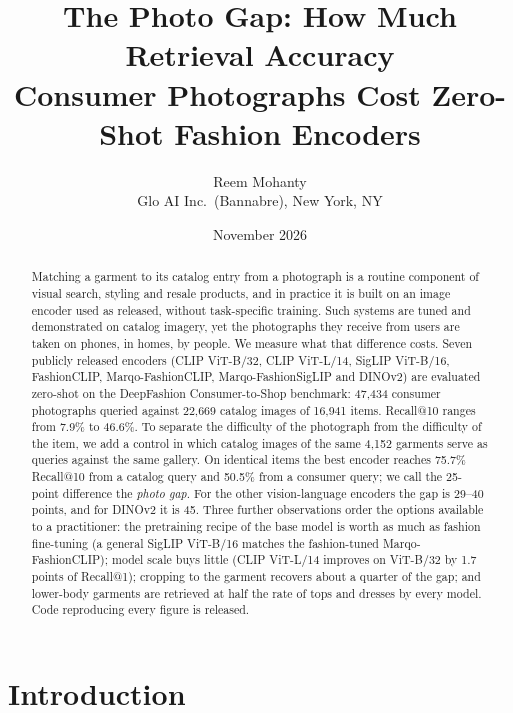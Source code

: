 \documentclass[10pt,twocolumn,letterpaper]{article}
\title{\LARGE\bfseries The Photo Gap: How Much Retrieval Accuracy\\Consumer Photographs Cost Zero-Shot Fashion Encoders}
\author{%
  Reem Mohanty\\
  Glo AI Inc.\ (Bannabre), New York, NY
}
\date{November 2026}
\begin{document}
\maketitle

\begin{abstract}
Matching a garment to its catalog entry from a photograph is a routine component of visual search, styling and resale products, and in practice it is built on an image encoder used as released, without task-specific training. Such systems are tuned and demonstrated on catalog imagery, yet the photographs they receive from users are taken on phones, in homes, by people. We measure what that difference costs. Seven publicly released encoders (CLIP ViT-B/32, CLIP ViT-L/14, SigLIP ViT-B/16, FashionCLIP, Marqo-FashionCLIP, Marqo-FashionSigLIP and DINOv2) are evaluated zero-shot on the DeepFashion Consumer-to-Shop benchmark: 47,434 consumer photographs queried against 22,669 catalog images of 16,941 items. Recall@10 ranges from 7.9\% to 46.6\%. To separate the difficulty of the photograph from the difficulty of the item, we add a control in which catalog images of the same 4,152 garments serve as queries against the same gallery. On identical items the best encoder reaches 75.7\% Recall@10 from a catalog query and 50.5\% from a consumer query; we call the 25-point difference the \emph{photo gap}. For the other vision-language encoders the gap is 29--40 points, and for DINOv2 it is 45. Three further observations order the options available to a practitioner: the pretraining recipe of the base model is worth as much as fashion fine-tuning (a general SigLIP ViT-B/16 matches the fashion-tuned Marqo-FashionCLIP); model scale buys little (CLIP ViT-L/14 improves on ViT-B/32 by 1.7 points of Recall@1); cropping to the garment recovers about a quarter of the gap; and lower-body garments are retrieved at half the rate of tops and dresses by every model. Code reproducing every figure is released.
\end{abstract}

\section{Introduction}
\end{document}
